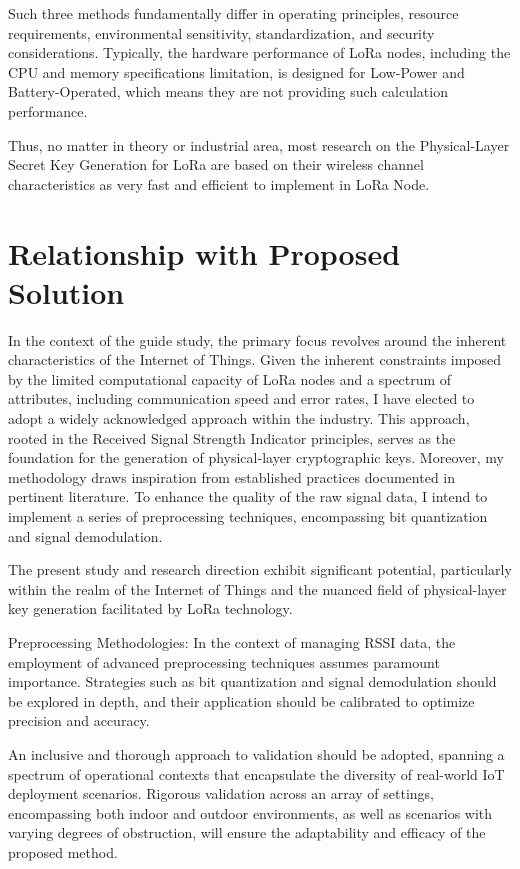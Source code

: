 Such three methods fundamentally differ in operating principles, resource requirements, environmental sensitivity, standardization, and security considerations. Typically, the hardware performance of LoRa nodes, including the CPU and memory specifications limitation, is designed for Low-Power and Battery-Operated, which means they are not providing such calculation performance.

Thus, no matter in theory or industrial area, most research on the Physical-Layer Secret Key Generation for LoRa are based on their wireless channel characteristics as very fast and efficient to implement in LoRa Node.

\section{Relationship with Proposed Solution}
In the context of the guide study, the primary focus revolves around the inherent characteristics of the Internet of Things. Given the inherent constraints imposed by the limited computational capacity of LoRa nodes and a spectrum of attributes, including communication speed and error rates, I have elected to adopt a widely acknowledged approach within the industry. This approach, rooted in the Received Signal Strength Indicator principles, serves as the foundation for the generation of physical-layer cryptographic keys. Moreover, my methodology draws inspiration from established practices documented in pertinent literature. To enhance the quality of the raw signal data, I intend to implement a series of preprocessing techniques, encompassing bit quantization and signal demodulation.

The present study and research direction exhibit significant potential, particularly within the realm of the Internet of Things and the nuanced field of physical-layer key generation facilitated by LoRa technology. 

Preprocessing Methodologies: In the context of managing RSSI data, the employment of advanced preprocessing techniques assumes paramount importance. Strategies such as bit quantization and signal demodulation should be explored in depth, and their application should be calibrated to optimize precision and accuracy.

An inclusive and thorough approach to validation should be adopted, spanning a spectrum of operational contexts that encapsulate the diversity of real-world IoT deployment scenarios. Rigorous validation across an array of settings, encompassing both indoor and outdoor environments, as well as scenarios with varying degrees of obstruction, will ensure the adaptability and efficacy of the proposed method.

